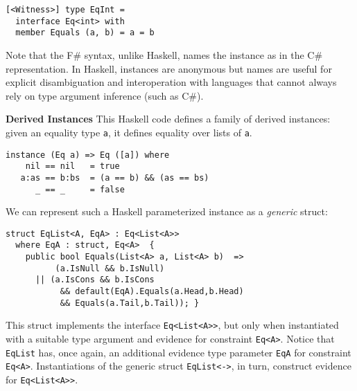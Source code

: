 \documentclass[9pt]{sig-alternate-05-2015}
\begin{document}
\begin{lstlisting}
[<Witness>] type EqInt =
  interface Eq<int> with 
  member Equals (a, b) = a = b
\end{lstlisting}

Note that the F\# syntax, unlike Haskell, names the instance as in the  C\# representation.
In Haskell, instances are anonymous but names are useful for explicit disambiguation and interoperation with languages that cannot always rely on type argument inference (such as C\#).
\fi


{\bf Derived Instances}
This Haskell code defines a family of derived instances: given an equality  type \lstinline{a}, it defines equality over lists of \lstinline{a}.
{\small
\begin{lstlisting}
instance (Eq a) => Eq ([a]) where 
    nil == nil   = true
   a:as == b:bs  = (a == b) && (as == bs)
      _ == _     = false
\end{lstlisting}
}

We can represent such a Haskell parameterized instance as a \emph{generic} struct:


\begin{lstlisting}
struct EqList<A, EqA> : Eq<List<A>>
  where EqA : struct, Eq<A>  {
    public bool Equals(List<A> a, List<A> b)  =>
          (a.IsNull && b.IsNull)
      || (a.IsCons && b.IsCons 
           && default(EqA).Equals(a.Head,b.Head) 
           && Equals(a.Tail,b.Tail)); }
\end{lstlisting}

This struct implements the interface \lstinline{Eq<List<A>>}, but only when instantiated with a suitable type argument and evidence for constraint \lstinline{Eq<A>}.
Notice that \lstinline{EqList} has, once again, an additional evidence type parameter  \lstinline{EqA} for constraint \lstinline{Eq<A>}.
Instantiations of the generic struct \lstinline{EqList<->}, in turn, construct evidence for \lstinline{Eq<List<A>>}.
\end{document}
